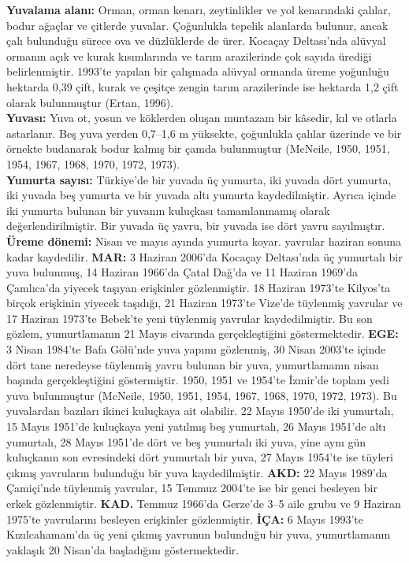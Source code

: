 \documentclass[
  10.5pt,
  a4paper,
  DIV=11,
  numbers=noendperiod,
  twocolumn]{scrreprt}
\begin{document}
\textbf{Yuvalama alanı:} Orman, orman kenarı, zeytinlikler ve yol
kenarındaki çalılar, bodur ağaçlar ve çitlerde yuvalar. Çoğunlukla
tepelik alanlarda bulunur, ancak çalı bulunduğu sürece ova ve
düzlüklerde de ürer. Kocaçay Deltası'nda alüvyal ormanın açık ve kurak
kısımlarında ve tarım arazilerinde çok sayıda ürediği belirlenmiştir.
1993'te yapılan bir çalışmada alüvyal ormanda üreme yoğunluğu hektarda
0,39 çift, kurak ve çeşitçe zengin tarım arazilerinde ise hektarda 1,2
çift olarak bulunmuştur (Ertan, 1996).\\
\textbf{Yuvası:} Yuva ot, yosun ve köklerden oluşan muntazam bir
kâsedir, kıl ve otlarla astarlanır. Beş yuva yerden 0,7--1,6 m yüksekte,
çoğunlukla çalılar üzerinde ve bir örnekte budanarak bodur kalmış bir
çamda bulunmuştur (McNeile, 1950, 1951, 1954, 1967, 1968, 1970, 1972,
1973).\\
\textbf{Yumurta sayısı:} Türkiye'de bir yuvada üç yumurta, iki yuvada
dört yumurta, iki yuvada beş yumurta ve bir yuvada altı yumurta
kaydedilmiştir. Ayrıca içinde iki yumurta bulunan bir yuvanın kuluçkası
tamamlanmamış olarak değerlendirilmiştir. Bir yuvada üç yavru, bir
yuvada ise dört yavru sayılmıştır.\\
\textbf{Üreme dönemi:} Nisan ve mayıs ayında yumurta koyar. yavrular
haziran sonuna kadar kaydedilir. \textbf{MAR:} 3 Haziran 2006'da Kocaçay
Deltası'nda üç yumurtalı bir yuva bulunmuş, 14 Haziran 1966'da Çatal
Dağ'da ve 11 Haziran 1969'da Çamlıca'da yiyecek taşıyan erişkinler
gözlenmiştir. 18 Haziran 1973'te Kilyos'ta birçok erişkinin yiyecek
taşıdığı, 21 Haziran 1973'te Vize'de tüylenmiş yavrular ve 17 Haziran
1973'te Bebek'te yeni tüylenmiş yavrular kaydedilmiştir. Bu son gözlem,
yumurtlamanın 21 Mayıs civarında gerçekleştiğini göstermektedir.
\textbf{EGE:} 3 Nisan 1984'te Bafa Gölü'nde yuva yapımı gözlenmiş, 30
Nisan 2003'te içinde dört tane neredeyse tüylenmiş yavru bulunan bir
yuva, yumurtlamanın nisan başında gerçekleştiğini göstermiştir. 1950,
1951 ve 1954'te İzmir'de toplam yedi yuva bulunmuştur (McNeile, 1950,
1951, 1954, 1967, 1968, 1970, 1972, 1973). Bu yuvalardan bazıları ikinci
kuluçkaya ait olabilir. 22 Mayıs 1950'de iki yumurtalı, 15 Mayıs 1951'de
kuluçkaya yeni yatılmış beş yumurtalı, 26 Mayıs 1951'de altı yumurtalı,
28 Mayıs 1951'de dört ve beş yumurtalı iki yuva, yine aynı gün
kuluçkanın son evresindeki dört yumurtalı bir yuva, 27 Mayıs 1954'te ise
tüyleri çıkmış yavruların bulunduğu bir yuva kaydedilmiştir.
\textbf{AKD:} 22 Mayıs 1989'da Çamiçi'nde tüylenmiş yavrular, 15 Temmuz
2004'te ise bir genci besleyen bir erkek gözlenmiştir. \textbf{KAD.}
Temmuz 1966'da Gerze'de 3--5 aile grubu ve 9 Haziran 1975'te yavrularını
besleyen erişkinler gözlenmiştir. \textbf{İÇA:} 6 Mayıs 1993'te
Kızılcahamam'da üç yeni çıkmış yavrunun bulunduğu bir yuva,
yumurtlamanın yaklaşık 20 Nisan'da başladığını göstermektedir.
\end{document}
